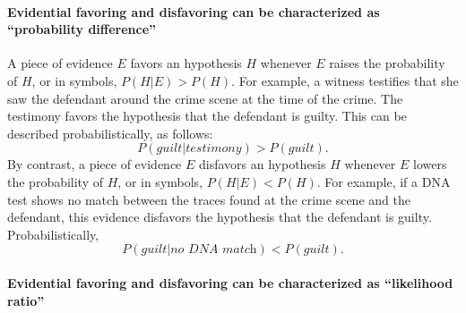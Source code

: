 \documentclass[10pt]{article}
\begin{document}
\paragraph{Evidential favoring and disfavoring can be characterized as ``probability difference''} A piece of evidence $E$ favors an 
hypothesis $H$ whenever $E$ raises the probability of $H$, or in symbols, 
$P(H|E) > P(H)$. 
For example, a witness 
testifies that she saw the defendant around the crime scene
 at the time of the crime. The testimony favors the hypothesis 
 that the defendant is guilty. 
This can be described probabilistically, as follows:
 \[ P(\textit{guilt}|\textit{testimony}) > P(\textit{guilt}).\] 
By contrast, a piece of evidence $E$ disfavors an hypothesis $H$ whenever $E$ lowers 
the probability of $H$, or in symbols, $P(H|E) < P(H)$.
For example, if a DNA test shows no match between the traces found at the crime
 scene and the defendant, this evidence disfavors the hypothesis that the defendant is guilty. 
 Probabilistically, 
%
\[ P(\textit{guilt}|\textit{no DNA match}) < P(\textit{guilt}).\]  
%
 
\paragraph{Evidential favoring and disfavoring can be characterized as ``likelihood ratio''} 
\end{document}
